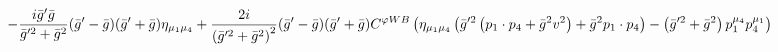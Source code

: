 %
\begin{dmath*}
%
  -  \frac{i {\bar g}^\prime {\bar g}{}}{{\bar g}^{\prime 2} + {\bar g}{}^2}({\bar g}^\prime - {\bar g}{}) ({\bar g}^\prime + {\bar g}{}) \eta_{\mu_1 \mu_4}  +  \frac{2 i}{\left({\bar g}^{\prime 2} + {\bar g}{}^2\right)^2}({\bar g}^\prime - {\bar g}{}) ({\bar g}^\prime + {\bar g}{}) C^{ \varphi  WB} \left(\eta_{\mu_1 \mu_4} \left({\bar g}^{\prime 2} \left(p_{1}\nobreak\cdot\nobreak{}p_{4} + {\bar g}{}^2 v^2\right) + {\bar g}{}^2 p_{1}\nobreak\cdot\nobreak{}p_{4}\right) - \left({\bar g}^{\prime 2} + {\bar g}{}^2\right) p_1^{\mu_4} p_4^{\mu_1}\right)
%
\end{dmath*}
%

